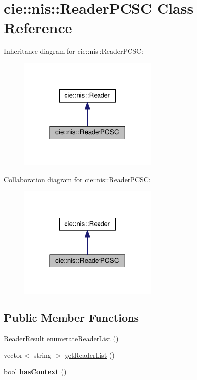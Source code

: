 \hypertarget{classcie_1_1nis_1_1ReaderPCSC}{\section{cie\-:\-:nis\-:\-:Reader\-P\-C\-S\-C Class Reference}
\label{classcie_1_1nis_1_1ReaderPCSC}
}


Inheritance diagram for cie\-:\-:nis\-:\-:Reader\-P\-C\-S\-C\-:
\nopagebreak
\begin{figure}[H]
\begin{center}
\leavevmode
\includegraphics[width=194pt]{classcie_1_1nis_1_1ReaderPCSC__inherit__graph}
\end{center}
\end{figure}


Collaboration diagram for cie\-:\-:nis\-:\-:Reader\-P\-C\-S\-C\-:
\nopagebreak
\begin{figure}[H]
\begin{center}
\leavevmode
\includegraphics[width=194pt]{classcie_1_1nis_1_1ReaderPCSC__coll__graph}
\end{center}
\end{figure}
\subsection*{Public Member Functions}
\begin{DoxyCompactItemize}
\item 
\hyperlink{nis__types_8h_a484156f5b8cf43396c5bbe77226fa8da}{Reader\-Result} \hyperlink{classcie_1_1nis_1_1ReaderPCSC_a56fcc4887491509d7ae634f89d18a8d6}{enumerate\-Reader\-List} ()
\item 
vector$<$ string $>$ \hyperlink{classcie_1_1nis_1_1ReaderPCSC_a696551fbfc3e27e5f8ea6f4118540bad}{get\-Reader\-List} ()
\item 
\hypertarget{classcie_1_1nis_1_1ReaderPCSC_a60f719d3f0216de1528a031747972257}{bool {\bfseries has\-Context} ()}\label{classcie_1_1nis_1_1ReaderPCSC_a60f719d3f0216de1528a031747972257}

\end{DoxyCompactItemize}
